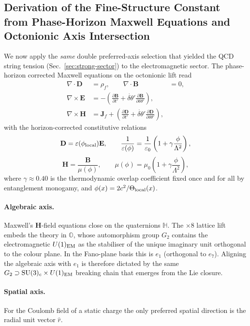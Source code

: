 \documentclass[12pt,a4paper]{article}
\begin{document}
\subsection{Derivation of the Fine-Structure Constant from Phase-Horizon Maxwell Equations and Octonionic Axis Intersection}

We now apply the \emph{same} double preferred-axis selection that yielded the QCD string tension (Sec.~\ref{sec:strong-sector}) to the electromagnetic sector. The phase-horizon corrected Maxwell equations on the octonionic lift read
\begin{align}
\nabla \cdot \mathbf{D} &= \rho_f, \qquad
\nabla \cdot \mathbf{B} &= 0, \\
\nabla \times \mathbf{E} &= -\left( \frac{\partial \mathbf{B}}{\partial t'} + \dot{\delta\theta}' \frac{\partial \mathbf{B}}{\partial \delta\theta'} \right), \\
\nabla \times \mathbf{H} &= \mathbf{J}_f + \left( \frac{\partial \mathbf{D}}{\partial t'} + \dot{\delta\theta}' \frac{\partial \mathbf{D}}{\partial \delta\theta'} \right),
\end{align}
with the horizon-corrected constitutive relations
\[
\mathbf{D} = \varepsilon(\phi_{\rm local})\mathbf{E}, \qquad
\frac{1}{\varepsilon(\phi)} = \frac{1}{\varepsilon_0}\left(1 + \gamma \frac{\phi}{\Lambda^2}\right),
\]
\[
\mathbf{H} = \frac{\mathbf{B}}{\mu(\phi)}, \qquad
\mu(\phi) = \mu_0\left(1 + \gamma \frac{\phi}{\Lambda^2}\right),
\]
where \(\gamma \approx 0.40\) is the thermodynamic overlap coefficient fixed once and for all by entanglement monogamy, and \(\phi(x) = 2c^2/\Theta_{\rm local}(x)\).

\paragraph{Algebraic axis.}
Maxwell's $\mathbf{H}$-field equations close on the quaternions $\mathbb{H}$. The $\times 8$ lattice lift embeds the theory in $\mathbb{O}$, whose automorphism group $G_2$ contains the electromagnetic $U(1)_{\rm EM}$ as the stabiliser of the unique imaginary unit orthogonal to the colour plane. In the Fano-plane basis this is $e_1$ (orthogonal to $e_7$). Aligning the algebraic axis with $e_1$ is therefore dictated by the same $G_2 \supset \mathrm{SU}(3)_c \times U(1)_{\rm EM}$ breaking chain that emerges from the Lie closure.

\paragraph{Spatial axis.} For the Coulomb field of a static charge the only preferred spatial direction is the radial unit vector \(\hat{r}\).
\end{document}
